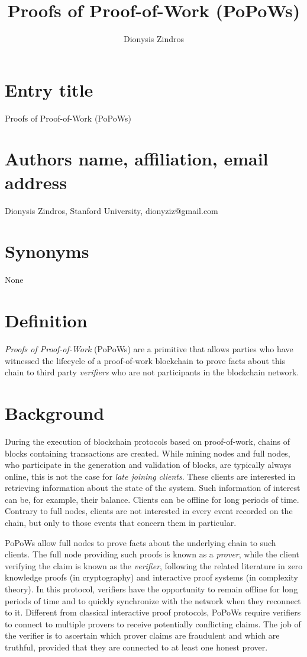 \documentclass[runningheads]{format/llncs}
\title{
Proofs of Proof-of-Work (PoPoWs)
}
\author{Dionysis Zindros}
\institute{Stanford University}
\begin{document}
\maketitle

\section*{Entry title}
Proofs of Proof-of-Work (PoPoWs)

\section*{Authors name, affiliation, email address}
Dionysis Zindros,
Stanford University,
dionyziz@gmail.com

\section*{Synonyms}
None

\section*{Definition}
\emph{Proofs of Proof-of-Work} (PoPoWs) are a primitive
that allows parties who have witnessed the lifecycle of a proof-of-work blockchain to
prove facts about this chain to third party \emph{verifiers} who are not participants
in the blockchain network.

\section*{Background}

During the execution of blockchain protocols based on proof-of-work, chains of blocks containing transactions are created. While mining nodes and full nodes, who participate in the generation and validation of blocks, are typically always online, this is not the case for \emph{late joining clients}. These clients are interested in retrieving information about the state of the system. Such information of interest can be, for example, their balance. Clients can be offline for long periods of time. Contrary to full nodes, clients are not interested in every event recorded on the chain, but only to those events that concern them in particular.

PoPoWs allow full nodes to prove facts about the underlying chain to such clients. The full node providing such proofs is known as a \emph{prover}, while the client verifying the claim is known as the \emph{verifier}, following the related literature in zero knowledge proofs (in cryptography) and interactive proof systems (in complexity theory). In this protocol, verifiers have the opportunity to remain offline for long periods of time and to quickly synchronize with the network when they reconnect to it. Different from classical interactive proof protocols, PoPoWs require verifiers to connect to multiple provers to receive potentially conflicting claims. The job of the verifier is to ascertain which prover claims are fraudulent and which are truthful, provided that they are connected to at least one honest prover.
\end{document}

